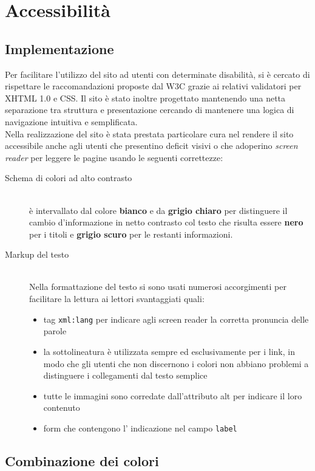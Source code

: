 \documentclass[11pt]{article}
\begin{document}
\newpage
\section{Accessibilità}
\label{sec:Accessibilita}
\subsection{Implementazione}
Per facilitare l'utilizzo del sito ad utenti con determinate disabilità, si è cercato di rispettare le raccomandazioni proposte dal W3C grazie ai relativi validatori per XHTML 1.0 e CSS. Il sito è stato inoltre progettato mantenendo una netta separazione tra struttura e presentazione cercando di mantenere una logica di navigazione intuitiva e semplificata.
\hfill\\
Nella realizzazione del sito è stata prestata particolare cura nel rendere il sito accessibile anche agli utenti che presentino deficit visivi o che adoperino \textit{screen reader} per leggere le pagine usando le seguenti correttezze:
\begin{description}
	\item[Schema di colori ad alto contrasto]\hfill\\
	 è intervallato dal colore \textbf{bianco} e da \textbf{grigio chiaro} per distinguere il cambio d'informazione in netto contrasto col testo che risulta essere \textbf{nero }per i titoli e \textbf{grigio scuro} per le restanti informazioni.
	\item[Markup del testo] \hfill \\
	Nella formattazione del testo si sono usati numerosi accorgimenti per facilitare la lettura ai lettori svantaggiati quali:
	\begin{itemize}
		\item tag \texttt{xml:lang} per indicare agli screen reader la corretta pronuncia delle parole
		\item la sottolineatura è utilizzata sempre ed esclusivamente per i link, in modo che gli utenti che non discernono i colori non abbiano problemi a distinguere i collegamenti dal testo semplice
		\item tutte le immagini sono corredate dall'attributo alt per indicare il loro contenuto
		\item form che contengono l' indicazione nel campo \texttt{label}
	\end{itemize}
\end{description}

\subsection{Combinazione dei colori}
\newpage
\end{document}
